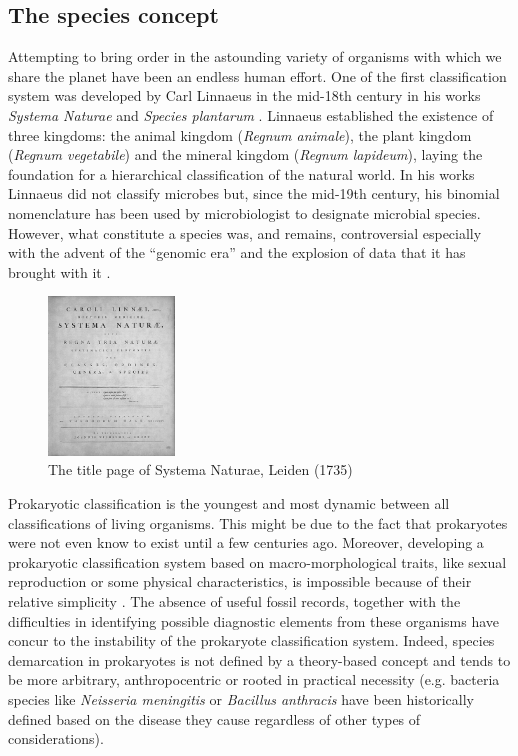 \subsection{The species concept}
Attempting to bring order in the astounding variety of organisms with which we share the planet have been an endless human effort. One of the first classification system was developed by Carl Linnaeus in the mid-18th century in his works \textit{Systema Naturae} and \textit{Species plantarum} \cite{linnaeus1800species, bhl10277}. Linnaeus established the existence of three kingdoms: the animal kingdom (\textit{Regnum animale}), the plant kingdom (\textit{Regnum vegetabile}) and the mineral kingdom (\textit{Regnum lapideum}), laying the foundation for a hierarchical classification of the natural world. In his works Linnaeus did not classify microbes but, since the mid-19th century, his binomial nomenclature has been used by microbiologist to designate microbial species. However, what constitute a species was, and remains, controversial especially with the advent of the ``genomic era'' and the explosion of data that it has brought with it \cite{doolittle2006genomics}.\\
\begin{figure}[!tb]
	\centering
	\includegraphics[width=0.3\textwidth]{./figures/Introduction/systema_naturae}
	\caption{The title page of Systema Naturae, Leiden (1735)}
\end{figure}
Prokaryotic classification is the youngest and most dynamic between all classifications of living organisms. This might be due to the fact that prokaryotes were not even know to exist until a few centuries ago. Moreover, developing a prokaryotic classification system based on macro-morphological traits, like sexual reproduction or some physical characteristics, is impossible because of their relative simplicity \cite{cowan1965principles}. The absence of useful fossil records, together with the difficulties in identifying possible diagnostic elements from these organisms have concur to the instability of the prokaryote classification system. Indeed, species demarcation in prokaryotes is not defined by a theory-based concept and tends to be more arbitrary, anthropocentric or rooted in practical necessity (e.g. bacteria species like \textit{Neisseria meningitis} or \textit{Bacillus anthracis} have been historically defined based on the disease they cause regardless of other types of considerations).\\
